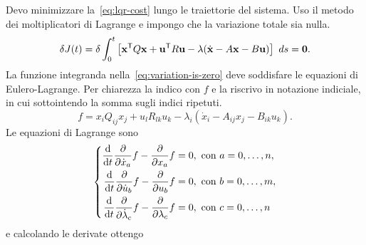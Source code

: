 \label{subsec:derivazione-riccati}
Devo minimizzare la~\eqref{eq:lqr-cost} lungo le traiettorie del sistema.
Uso il metodo dei moltiplicatori di Lagrange e impongo che la variazione totale sia nulla.
\begin{equation*}
    \delta J(t) = \delta \int_0^t
    \left[ \mathbf{x}^{\mathsf{T}} Q \mathbf{x} + \mathbf{u}^{\mathsf{T}} R \mathbf{u}  - \mathbf{\lambda}(\dot{ \mathbf{x}} - A \mathbf{x} - B\mathbf{u})
    \right]\ ds = \mathbf{0}.
    \label{eq:variation-is-zero}
\end{equation*}
La funzione integranda nella~\eqref{eq:variation-is-zero} deve
soddisfare le equazioni di Eulero-Lagrange.
Per chiarezza la indico con $f$ e la riscrivo in notazione indiciale,
in cui sottointendo la somma sugli indici ripetuti.
\begin{equation*}
    f = x_i Q_{ij} x_j + u_l R_{lk} u_k - \lambda_i(\dot x_i - A_{ij} x_j - B_{ik} u_k).
\end{equation*}
Le equazioni di Lagrange sono
\begin{equation*}
    \left\{
    \begin{aligned}
        \frac {\text d} {\text d t} \frac \partial {\partial \dot x_a} f - \frac \partial {\partial x_a} f &= 0, \text{ con } a = 0, \ldots, n, \\
        \frac {\text d} {\text d t} \frac \partial {\partial \dot u_b} f - \frac \partial {\partial u_b} f &= 0, \text{ con } b = 0, \ldots, m, \\
        \frac {\text d} {\text d t} \frac \partial {\partial \dot \lambda_c} f - \frac \partial {\partial \lambda_c} f &= 0, \text{ con } c = 0, \ldots, n
    \end{aligned}
    \right.
\end{equation*}
e calcolando le derivate ottengo

